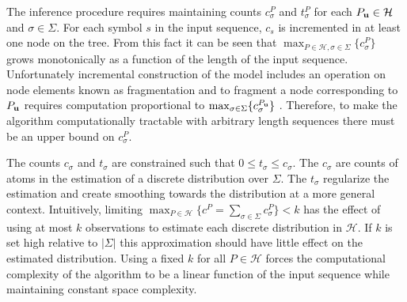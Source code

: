 The inference procedure requires maintaining counts $c^P_\sigma$ and $t^P_\sigma$ for each $P_{\bf u} \in \mathcal{H}$ and $\sigma \in \Sigma$.  For each symbol $s$ in the input sequence, $c_{s}$ is incremented in at least one node on the tree.  From this fact it can be seen that $\max_{P \in \mathcal{H}, \sigma \in \Sigma} \{ c^{P}_{\sigma} \}$ grows monotonically as a function of the length of the input sequence. Unfortunately incremental construction of the model includes an operation on node elements known as fragmentation \citep{Wood2009} and to fragment a node corresponding to $P_{\bf u}$ requires computation proportional to $\max_{\sigma \in \Sigma} \{ c_{\sigma}^{P_{\bf u}} \}$ \citep{Gasthaus2011}. Therefore, to make the algorithm computationally tractable with arbitrary length sequences there must be an upper bound on $c^P_\sigma$.  

The counts $c_{\sigma}$ and $t_{\sigma}$ are constrained such that $0 \leq t_{\sigma} \leq c_{\sigma} $. The $c_{\sigma}$ are counts of atoms in the estimation of a discrete distribution over $\Sigma$.  The $t_{\sigma}$ regularize the estimation and create smoothing towards the distribution at a more general context.  Intuitively, limiting $\max_{P \in \mathcal{H}} \{ c^{P} =  \sum_{\sigma \in \Sigma} c^{P}_{\sigma} \} < k$  has the effect of using at most $k$ observations to estimate each discrete distribution in $\mathcal{H}$.  If $k$ is set high relative to $|\Sigma|$ this approximation should have little effect on the estimated distribution. Using a fixed $k$ for all $P \in \mathcal{H}$ forces the computational complexity of the algorithm to be a linear function of the input sequence while maintaining constant space complexity.







